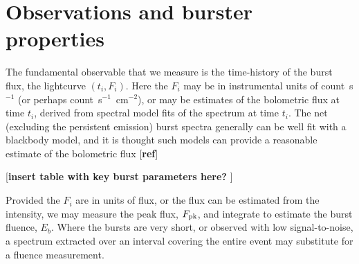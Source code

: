 \documentclass{aastex63}
\newcommand\latex{La\TeX}
\begin{document}

\section{Observations and burster properties} 
\label{sec:data}


\label{subsec:data}

The fundamental observable that we measure is the time-history of the burst flux, the lightcurve $(t_i,F_{i})$. Here the $F_{i}$ may be in instrumental units of count~s$^{-1}$ (or perhaps count~s$^{-1}$~cm$^{-2}$), or may be estimates of the bolometric flux at time $t_i$, derived from spectral model fits of the spectrum at time $t_i$.
%
The net (excluding the persistent emission) burst spectra generally can be well fit with a blackbody model, and it is thought such models can provide a reasonable estimate of the bolometric flux [{\bf ref}]

[{\bf insert table with key burst parameters here? }]


Provided the $F_i$ are in units of flux, or the flux can be estimated from the intensity,  we may measure the peak flux, $F_{\rm pk}$, and integrate to estimate the burst fluence, $E_b$. 
%
Where the bursts are very short, or observed with low signal-to-noise, a spectrum extracted over an interval covering the entire event may substitute for a fluence measurement.
\end{document}
